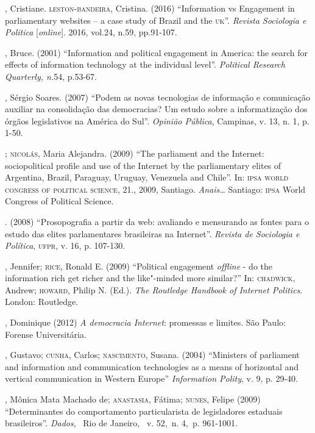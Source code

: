 \begin{bibliohedra}
, Cristiane. \textsc{leston}-\textsc{bandeira}, Cristina. (2016) ``Information vs
Engagement in parliamentary websites -- a case study of Brazil and the
\textsc{uk}''. \emph{Revista Sociologia e Politica} {[}\emph{\emph{online}}{]}. 2016, vol.24,
n.59, pp.91-107.

, Bruce. (2001) ``Information and political engagement in America:
the search for effects of information technology at the individual
level''. \emph{Political Research Quarterly, n.}54, p.53-67.

, Sérgio Soares. (2007) ``Podem as novas tecnologias de informação
e comunicação auxiliar na consolidação das democracias? Um estudo sobre
a informatização dos órgãos legislativos na América do Sul''.
\emph{Opinião Pública}, Campinas, v. 13, n. 1, p. 1-50.

\titidem; \textsc{nicolás}, Maria Alejandra. (2009) ``The parliament and the
Internet: sociopolitical profile and use of the Internet by the
parliamentary elites of Argentina, Brazil, Paraguay, Uruguay, Venezuela
and Chile''. In: \textsc{ipsa world congress of political science}, 21., 2009,
Santiago. \emph{Anais\ldots{}} Santiago: \textsc{ipsa} World Congress of Political
Science.

\titidem. (2008) ``Prosopografia a partir
da web: avaliando e mensurando as fontes para o estudo das elites
parlamentares brasileiras na Internet''. \emph{Revista de Sociologia e
Política}, \textsc{ufpr}, v. 16, p. 107-130.

, Jennifer; \textsc{rice}, Ronald E. (2009) ``Political engagement
\emph{offline} - do the information rich get richer and the like"-minded more
similar?'' In: \textsc{chadwick}, Andrew; \textsc{howard}, Philip N. (Ed.). \emph{The
Routledge Handbook of Internet Politics}. London: Routledge.

, Dominique (2012) \emph{A democracia Internet}: promessas e
limites. São Paulo: Forense Universitária.

, Gustavo; \textsc{cunha}, Carlos; \textsc{nascimento}, Susana. (2004) ``Ministers
of parliament and information and communication technologies as a means
of horizontal and vertical communication in Western Europe''
\emph{Information Polity}, v. 9, p. 29-40.

, Mônica Mata Machado de; \textsc{anastasia}, Fátima; \textsc{nunes}, Felipe (2009)
``Determinantes do comportamento particularista de legisladores
estaduais brasileiros''. \emph{Dados},~ Rio de Janeiro,~ v. 52,~n. 4,~p.
961-1001.


\end{bibliohedra}
